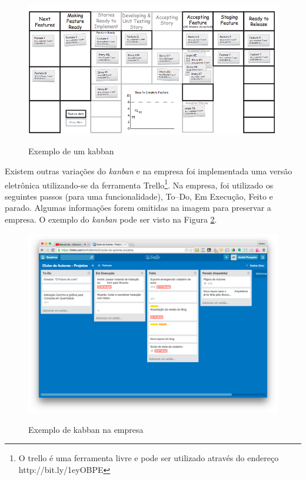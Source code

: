 \begin{figure}[htb!]
\begin{center}
\caption{Exemplo de um kabban}
\label{fig:kanban}
\includegraphics[width=14cm]{assets/kanban} \\
\end{center}
\end{figure}

Existem outras variações do \textit{kanban} e na empresa foi implementada uma versão eletrônica utilizando-se da ferramenta Trello\footnote{O trello é uma ferramenta livre e pode ser utilizado através do endereço http://bit.ly/1eyOBPE}. Na empresa, foi utilizado os seguintes passos (para uma funcionalidade), To--Do, Em Execução, Feito e parado. Algumas informações forem omitidas na imagem para preservar a empresa. O exemplo do \textit{kanban} pode ser visto na Figura \ref{fig:trello}.

\begin{figure}[htb!]
\begin{center}
\caption{Exemplo de kabban na empresa}
\label{fig:trello}
\includegraphics[width=14cm]{assets/trello} \\
\end{center}
\end{figure}

